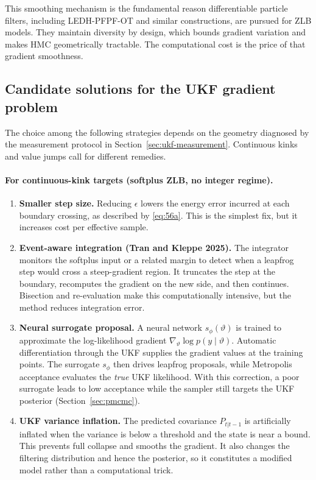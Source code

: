 \documentclass[11pt]{article}
\begin{document}
This smoothing mechanism is the fundamental reason differentiable particle filters, including LEDH-PFPF-OT and similar constructions, are pursued for ZLB models. They maintain diversity by design, which bounds gradient variation and makes HMC geometrically tractable. The computational cost is the price of that gradient smoothness.

\subsection{Candidate solutions for the UKF gradient problem}\label{sec:ukf-solutions}

The choice among the following strategies depends on the geometry diagnosed by the measurement protocol in Section~\ref{sec:ukf-measurement}. Continuous kinks and value jumps call for different remedies.

\paragraph{For continuous-kink targets (softplus ZLB, no integer regime).}
\begin{enumerate}
\item \textbf{Smaller step size.} Reducing $\epsilon$ lowers the energy error incurred at each boundary crossing, as described by \eqref{eq:56a}. This is the simplest fix, but it increases cost per effective sample.
\item \textbf{Event-aware integration (Tran and Kleppe 2025).} The integrator monitors the softplus input or a related margin to detect when a leapfrog step would cross a steep-gradient region. It truncates the step at the boundary, recomputes the gradient on the new side, and then continues. Bisection and re-evaluation make this computationally intensive, but the method reduces integration error.
\item \textbf{Neural surrogate proposal.} A neural network $s_\phi(\vartheta)$ is trained to approximate the log-likelihood gradient $\nabla_\vartheta\log p(y\mid\vartheta)$. Automatic differentiation through the UKF supplies the gradient values at the training points. The surrogate $s_\phi$ then drives leapfrog proposals, while Metropolis acceptance evaluates the \emph{true} UKF likelihood. With this correction, a poor surrogate leads to low acceptance while the sampler still targets the UKF posterior (Section~\ref{sec:pmcmc}).
\item \textbf{UKF variance inflation.} The predicted covariance $P_{t|t-1}$ is artificially inflated when the variance is below a threshold and the state is near a bound. This prevents full collapse and smooths the gradient. It also changes the filtering distribution and hence the posterior, so it constitutes a modified model rather than a computational trick.
\end{enumerate}
\end{document}
